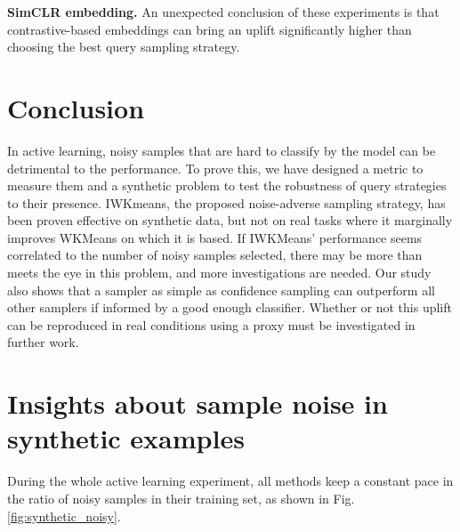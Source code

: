 \documentclass[runningheads]{llncs}
\begin{document}
\textbf{SimCLR embedding.} An unexpected conclusion of these experiments is that contrastive-based embeddings can bring an uplift significantly higher than choosing the best query sampling strategy.

\section{Conclusion}

In active learning, noisy samples that are hard to classify by the model can be detrimental to the performance.
To prove this, we have designed a metric to measure them and a synthetic problem to test the robustness of query strategies to their presence.
IWKmeans, the proposed noise-adverse sampling strategy, has been proven effective on synthetic data, but not on real tasks where it marginally improves WKMeans on which it is based. If IWKMeans' performance seems correlated to the number of noisy samples selected,
 there may be more than meets the eye in this problem, and more investigations are needed.
Our study also shows that a sampler as simple as confidence sampling can outperform all other samplers if
informed by a good enough classifier. Whether or not this uplift can be reproduced in real conditions using a
proxy must be investigated in further work.

\printbibliography

\clearpage
\appendix

\renewcommand{\thefigure}{A\arabic{figure}}

\section{Insights about sample noise in synthetic examples}

During the whole active learning experiment, all methods keep a constant pace in the ratio of noisy samples in their training set, as shown in Fig. \ref{fig:synthetic_noisy}.
\end{document}
